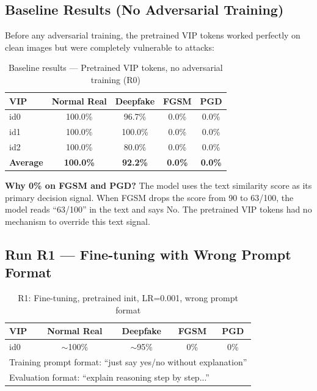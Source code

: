 \documentclass[12pt,a4paper]{article}
\begin{document}
\subsection{Baseline Results (No Adversarial Training)}

Before any adversarial training, the pretrained VIP tokens worked perfectly on clean images but were completely vulnerable to attacks:

\begin{table}[H]
\centering
\caption{Baseline results --- Pretrained VIP tokens, no adversarial training (R0)}
\begin{tabular}{@{}lcccc@{}}
\toprule
\textbf{VIP} & \textbf{Normal Real} & \textbf{Deepfake} & \textbf{FGSM} & \textbf{PGD} \\
\midrule
id0 & 100.0\% & 96.7\% & 0.0\% & 0.0\% \\
id1 & 100.0\% & 100.0\% & 0.0\% & 0.0\% \\
id2 & 100.0\% & 80.0\% & 0.0\% & 0.0\% \\
\midrule
\textbf{Average} & \textbf{100.0\%} & \textbf{92.2\%} & \textbf{0.0\%} & \textbf{0.0\%} \\
\bottomrule
\end{tabular}
\end{table}

\textbf{Why 0\% on FGSM and PGD?} The model uses the text similarity score as its primary decision signal. When FGSM drops the score from 90 to 63/100, the model reads ``63/100'' in the text and says No. The pretrained VIP tokens had no mechanism to override this text signal.

\subsection{Run R1 --- Fine-tuning with Wrong Prompt Format}

\begin{table}[H]
\centering
\caption{R1: Fine-tuning, pretrained init, LR=0.001, wrong prompt format}
\begin{tabular}{@{}lcccc@{}}
\toprule
\textbf{VIP} & \textbf{Normal Real} & \textbf{Deepfake} & \textbf{FGSM} & \textbf{PGD} \\
\midrule
id0 & $\sim$100\% & $\sim$95\% & 0\% & 0\% \\
\midrule
\multicolumn{5}{l}{\small Training prompt format: ``just say yes/no without explanation''} \\
\multicolumn{5}{l}{\small Evaluation format: ``explain reasoning step by step...''} \\
\bottomrule
\end{tabular}
\end{table}
\end{document}
